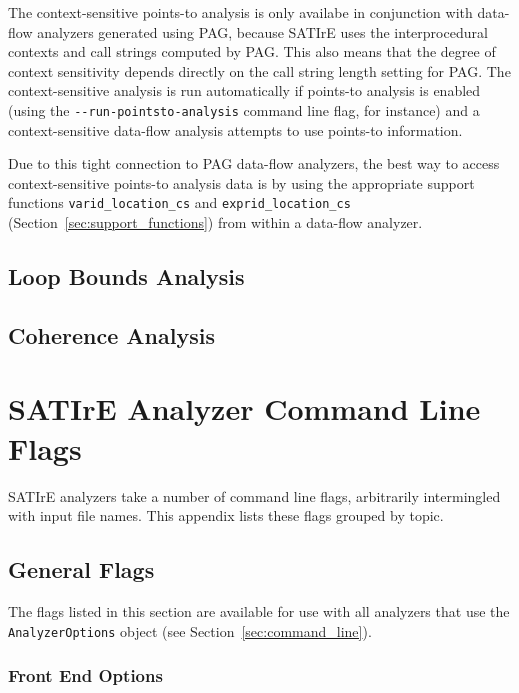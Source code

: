 \documentclass[a4paper,12pt]{report}
\begin{document}
The context-sensitive points-to analysis is only availabe in conjunction
with data-flow analyzers generated using PAG, because SATIrE uses the
interprocedural contexts and call strings computed by PAG. This also means
that the degree of context sensitivity depends directly on the call string
length setting for PAG. The context-sensitive analysis is run automatically
if points-to analysis is enabled (using the \verb|--run-pointsto-analysis|
command line flag, for instance) and a context-sensitive data-flow analysis
attempts to use points-to information.

Due to this tight connection to PAG data-flow analyzers, the best way to
access context-sensitive points-to analysis data is by using the appropriate
support functions \verb|varid_location_cs| and \verb|exprid_location_cs|
(Section~\ref{sec:support_functions}) from within a data-flow analyzer.

\section{Loop Bounds Analysis}
\label{sec:analysis_loopbounds}

\section{Coherence Analysis}
\label{sec:analysis_coherence}

\chapter{SATIrE Analyzer Command Line Flags}
\label{appendix:command_line}

SATIrE analyzers take a number of command line flags, arbitrarily
intermingled with input file names. This appendix lists these flags grouped
by topic.

\section{General Flags}
\label{sec:general_flags}

The flags listed in this section are available for use with all analyzers
that use the \texttt{AnalyzerOptions} object (see
Section~\ref{sec:command_line}).

\subsection{Front End Options}
\end{document}
